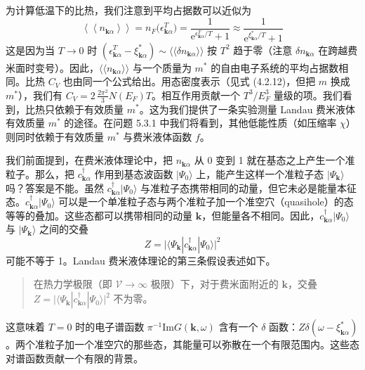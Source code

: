 为计算低温下的比热，我们注意到平均占据数可以近似为
\begin{equation*}
\left\langle\!\left\langle n_{\pmb{k}\alpha} \right\rangle\!\right\rangle = n_F\big( \epsilon^{T}_{\pmb{k}\alpha} \big) = \frac{1}{\mathrm{e}^{\epsilon^{T}_{\pmb{k}\alpha}/T} + 1} \approx \frac{1}{\mathrm{e}^{\xi^{*}_{\pmb{k}\alpha}/T} + 1}
\end{equation*}
这是因为当 $T\to 0$ 时 $(\epsilon^{T}_{\pmb{k}\alpha} - \xi^{*}_{\pmb{k}\alpha}) \sim \langle\!\langle \delta n_{\pmb{k}\alpha} \rangle\!\rangle$ 按 $T^{2}$ 趋于零（注意 $\delta n_{\pmb{k}\alpha}$ 在跨越费米面时变号）。因此，$\langle\!\langle n_{\pmb{k}\alpha} \rangle\!\rangle$ 与一个质量为 $m^{*}$ 的自由电子系统的平均占据数相同。比热 $C_V$ 也由同一个公式给出。用态密度表示（见式 (4.2.12)，但把 $m$ 换成 $m^{*}$），我们有 $C_V = 2\,\frac{2\pi^{2}}{3} N(E_F) T$。相互作用贡献一个 $T^{3}/E_F^{3}$ 量级的项。我们看到，比热只依赖于有效质量 $m^{*}$。这为我们提供了一条实验测量 Landau 费米液体有效质量 $m^{*}$ 的途径。在问题 5.3.1 中我们将看到，其他低能性质（如压缩率 $\chi$）则同时依赖于有效质量 $m^{*}$ 与费米液体函数 $f$。

我们前面提到，在费米液体理论中，把 $n_{\pmb{k}\alpha}$ 从 0 变到 1 就在基态之上产生一个准粒子。那么，把 $c^{\dagger}_{\pmb{k}\alpha}$ 作用到基态波函数 $|\Psi_0\rangle$ 上，能产生这样一个准粒子态 $|\Psi_{\pmb{k}}\rangle$ 吗？答案是不能。虽然 $c^{\dagger}_{\pmb{k}\alpha}|\Psi_0\rangle$ 与准粒子态携带相同的动量，但它未必是能量本征态。$c^{\dagger}_{\pmb{k}\alpha}|\Psi_0\rangle$ 可以是一个单准粒子态与两个准粒子加一个准空穴（quasihole）的态等等的叠加。这些态都可以携带相同的动量 $\pmb{k}$，但能量各不相同。因此，$c^{\dagger}_{\pmb{k}\alpha}|\Psi_0\rangle$ 与 $|\Psi_{\pmb{k}}\rangle$ 之间的交叠
\begin{equation*}
Z = \big| \langle \Psi_{\pmb{k}} | c^{\dagger}_{\pmb{k}\alpha} | \Psi_0 \rangle \big|^{2}
\end{equation*}
可能不等于 1。Landau 费米液体理论的第三条假设表述如下。

\begin{quote}
在热力学极限（即 $\mathcal{V}\to\infty$ 极限）下，对于费米面附近的 $\pmb{k}$，交叠 $Z = \big|\langle \Psi_{\pmb{k}} | c^{\dagger}_{\pmb{k}\alpha} | \Psi_0 \rangle\big|^{2}$ 不为零。
\end{quote}

这意味着 $T=0$ 时的电子谱函数 $\pi^{-1}\mathrm{Im}G(\pmb{k},\omega)$ 含有一个 $\delta$ 函数：$Z\delta(\omega - \xi^{*}_{\pmb{k}\alpha})$。两个准粒子加一个准空穴的那些态，其能量可以弥散在一个有限范围内。这些态对谱函数贡献一个有限的背景。

